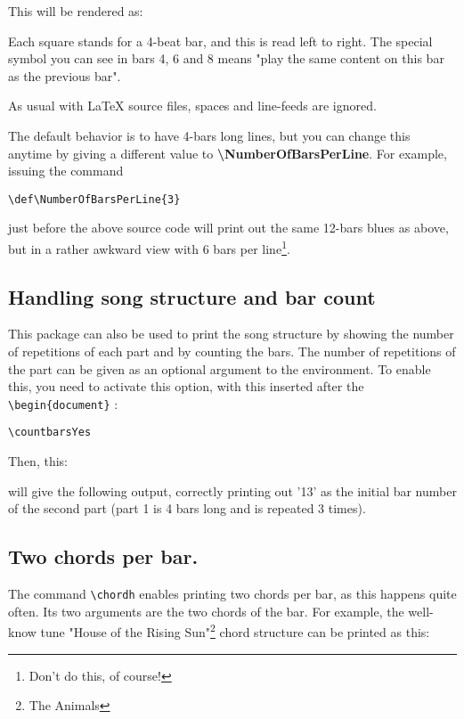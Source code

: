 \documentclass[11pt]{article}
\newcommand{\btt}{\bfseries \ttfamily }
\newcommand{\tbs}{\textbackslash{}}
\begin{document}



This will be rendered as:



Each square stands for a 4-beat bar, and this is read left to right.
The special symbol you can see in bars 4, 6 and 8 means "play the same content on this bar as the previous bar".

As usual with \LaTeX{} source files, spaces and line-feeds are ignored.

The default behavior is to have 4-bars long lines, but you can change this anytime by giving a different value to {\btt \tbs NumberOfBarsPerLine}. For example, issuing the command

\begin{lstlisting}
\def\NumberOfBarsPerLine{3}
\end{lstlisting}

just before the above source code will print out the same 12-bars blues as above, but in a rather awkward view with 6 bars per line\footnote{Don't do this, of course!}.

\def\NumberOfBarsPerLine{6}


\subsection{Handling song structure and bar count}

This package can also be used to print the song structure by showing the number of repetitions of each part and by counting the bars.
The number of repetitions of the part can be given as an optional argument to the environment.
To enable this, you need to activate this option, with this inserted after the \verb!\begin{document}! :

\begin{lstlisting}
\countbarsYes
\end{lstlisting}

Then, this:


will give the following output, correctly printing out '13' as the initial bar number of the second part (part 1 is 4 bars long and is repeated 3 times).

\def\NumberOfBarsPerLine{4}
\resetchordbars
\countbarsYes


\subsection{Two chords per bar.} 
The command \verb|\chordh| enables printing two chords per bar, as this happens quite often.
Its two arguments are the two chords of the bar.
For example, the well-know tune "House of the Rising Sun"\footnote{The Animals} chord structure can be printed as this:
\end{document}
